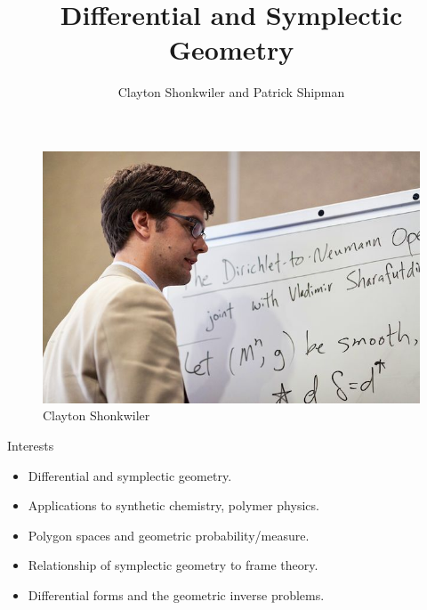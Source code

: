 \documentclass[aspectratio=169]{beamer}
\title{Differential and Symplectic Geometry}
\author{Clayton Shonkwiler and Patrick Shipman}
\begin{document}
 
    \begin{frame}{}
\vfill
        \begin{figure}
            \centering
            \includegraphics[width=.7\textwidth]{clay.jpg}
			\caption{Clayton Shonkwiler}
        \end{figure}\vfill
    \end{frame}
    
    
    \begin{frame}{Interests}
\vfill
        \begin{itemize}
            \item Differential and symplectic geometry.
            \item Applications to synthetic chemistry, polymer physics.
            \item Polygon spaces and geometric probability/measure.
			\item Relationship of symplectic geometry to frame theory.
			\item Differential forms and the geometric inverse problems.
        \end{itemize}
\vfill
    \end{frame}
\end{document}
